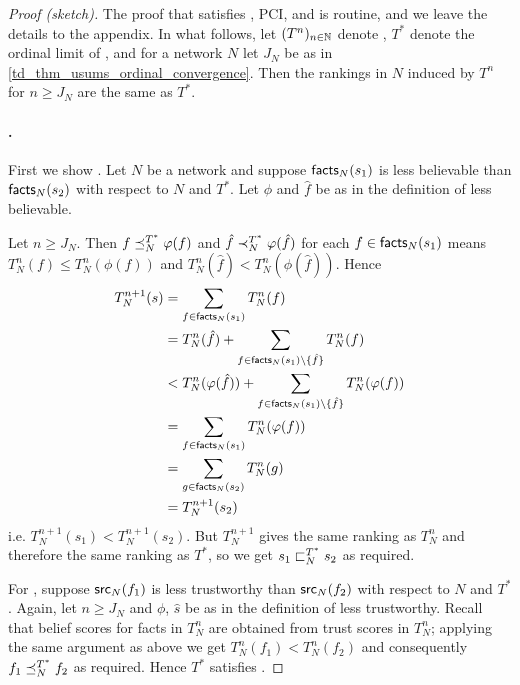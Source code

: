 \begin{proof}[Proof (sketch)]

    The proof that \usums{} satisfies \symmetry{}, PCI, \unanimity{} and
    \groundedness{} is
routine, and we leave the details to the appendix. In what follows, let
$(T^n)_{n \in \mathbb{N}}$ denote \usums{}, $T^*$ denote the ordinal limit of
\usums{}, and for a network $N$ let $J_N$ be as in
\cref{td_thm_usums_ordinal_convergence}. Then the rankings in $N$ induced by $T^n$
for $n \ge J_N$ are the same as $T^*$.

    \paragraph{\coherence{}.}
    First we show \sourcecoherence{}. Let $N$ be a network and suppose
$\mathsf{facts}_N(s_1)$ is less believable than $\mathsf{facts}_N(s_2)$ with respect to $N$ and
$T^*$. Let $\phi$ and $\hat{f}$ be as in the definition of less believable.

Let $n \ge J_N$. Then $f \preceq_N^{T^*} \varphi(f)$ and $\hat{f} \prec_N^{T^*}
\varphi(\hat{f})$ for each $f \in \mathsf{facts}_N(s_1)$ means $T_N^n(f) \le
T_N^n(\phi(f))$ and $T_N^n(\hat{f}) < T_N^n(\phi(\hat{f}))$. Hence
\begin{align*}
    T_N^{n+1}(s)
    &= \sum_{f \in \mathsf{facts}_N(s_1)}{T_N^n(f)} \\
    &= T_N^n(\hat{f}) + \sum_{f \in \mathsf{facts}_N(s_1) \setminus \{\hat{f}\}}{T_N^n(f)} \\
    &< T_N^n(\varphi(\hat{f})) + \sum_{f \in \mathsf{facts}_N(s_1) \setminus \{\hat{f}\}}{T_N^n(\varphi(f))} \\
    &= \sum_{f \in \mathsf{facts}_N(s_1)}{T_N^n(\varphi(f))} \\
    &= \sum_{g \in \mathsf{facts}_N(s_2)}{T_N^n(g)} \\
    &= T_N^{n+1}(s_2)
\end{align*}
i.e. $T_N^{n+1}(s_1) < T_N^{n+1}(s_2)$. But $T_N^{n+1}$ gives the same ranking
as $T_N^n$ and therefore the same ranking as $T^*$, so we get $s_1 \sqsubset_N^{T^*}
s_2$ as required.

    For \factcoherence{}, suppose $\mathsf{src}_N(f_1)$ is less trustworthy than
$\mathsf{src}_N(f_2)$ with respect to $N$ and $T^*$. Again, let $n \ge J_N$ and $\phi$,
$\hat{s}$ be as in the definition of less trustworthy. Recall that belief
scores for facts in $T_N^n$ are obtained from trust scores in $T_N^n$; applying
the same argument as above we get $T_N^n(f_1) < T_N^n(f_2)$ and consequently
    $f_1 \preceq_N^{T^*} f_2$ as required. Hence $T^*$ satisfies \coherence{}.


\end{proof}
